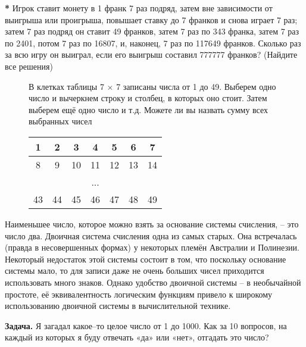 \begin{thm} \textbf{*}
Игрок ставит монету в 1 франк 7 раз подряд, затем вне зависимости от выигрыша или проигрыша, повышает ставку до 7 франков и снова играет 7 раз; затем 7 раз подряд он ставит 49 франков, затем 7 раз по 343 франка, затем 7 раз по 2401, потом 7 раз по 16807, и, наконец, 7 раз по 117649 франков. Сколько раз за всю игру он выиграл, если его выигрыш составил 777777 франков? (Найдите все решения)
\end{thm}

\begin{figure}
    \begin{minipage}{0.6\linewidth}
        \begin{thm}
            В клетках таблицы 7 $\times$ 7 записаны числа от 1 до 49. Выберем одно число и вычеркнем строку и столбец, в которых оно стоит. Затем выберем ещё одно число и т.д. Можете ли вы назвать сумму всех выбранных чисел 
        \end{thm}
    \end{minipage}
\hfill
    \begin{minipage}{0.35\linewidth}
        \begin{tabular}{ |c|c|c|c|c|c|c| } 
        \hline
        1 & 2 & 3 & 4 & 5 & 6 & 7 \\
        \hline
        8 & 9 & 10 & 11 & 12 & 13 & 14 \\
         & & & ... & & & \\
        43 & 44 & 45 & 46 & 47 & 48 & 49 \\
        \hline
        \end{tabular}
    \end{minipage}
\end{figure}

\noindent Наименьшее число, которое можно взять за основание системы счисления, -- это число два. Двоичная система счисления одна из самых старых. Она встречалась (правда в несовершенных формах) у некоторых племён Австралии и Полинезии. Некоторый недостаток этой системы состоит в том, что поскольку основание системы мало, то для записи даже не очень больших чисел приходится использовать много знаков. Однако удобство двоичной системы -- в необычайной простоте, её эквивалентность логическим функциям привело к широкому использованию двоичной системы в вычислительной технике.

\par \textbf{Задача.} Я загадал какое--то целое число от 1 до 1000. Как за 10 вопросов, на каждый из которых я буду отвечать «да» или «нет», отгадать это число?

